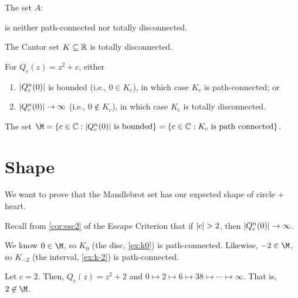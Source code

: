 \documentclass[class=pmath370,tikz,notes]{agony}
\begin{document}
\begin{example}
  The set $A$:
  \begin{center}
  \end{center}
  is neither path-connected nor totally disconnected.
\end{example}

\begin{example}
  The Cantor set $K \subseteq \mathbb{R}$ is totally disconnected.
\end{example}

\begin{theorem}\label{thm:aon}
  For $Q_c(z) = z^2 + c$, either
  \begin{enumerate}[nosep]
    \item $\abs{Q_c^n(0)}$ is bounded (i.e., $0 \in K_c$),
          in which case $K_c$ is path-connected; or
    \item $\abs{Q_c^n(0)} \to \infty$ (i.e., $0 \not\in K_c$),
          in which case $K_c$ is totally disconnected.
  \end{enumerate}
\end{theorem}

\begin{defn}
  The set $\M
    = \{c \in \C : \text{$\abs{Q_c^n(0)}$ is bounded}\}
    = \{c \in \C : \text{$K_c$ is path connected}\}$.
\end{defn}

\section{Shape}

We want to prove that the Mandlebrot set has our expected shape of circle + heart.

Recall from \cref{cor:esc2} of the Escape Criterion that if $\abs{c} > 2$,
then $\abs{Q_c^n(0)} \to \infty$.

\begin{example}
  We know $0 \in \M$, so $K_0$ (the disc, \cref{ex:k0}) is path-connected.
  Likewise, $-2 \in \M$, so $K_{-2}$ (the interval, \cref{ex:k-2}) is path-connected.
\end{example}

\begin{example}
  Let $c = 2$. Then, $Q_c(z) = z^2 + 2$
  and $0 \mapsto 2 \mapsto 6 \mapsto 38 \mapsto \cdots \mapsto \infty$.
  That is, $2 \not\in \M$.
\end{example}
\end{document}
